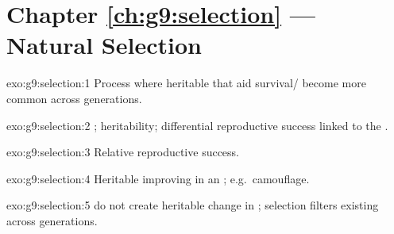 \section*{Chapter \ref{ch:g9:selection} --- Natural Selection}

\begin{solution}{exo:g9:selection:1}
Process where heritable  that aid survival/ become more
common across generations.
\end{solution}

\begin{solution}{exo:g9:selection:2}
; heritability; differential reproductive success linked to the
.
\end{solution}

\begin{solution}{exo:g9:selection:3}
Relative reproductive success.
\end{solution}

\begin{solution}{exo:g9:selection:4}
Heritable  improving  in an ; e.g.\ camouflage.
\end{solution}

\begin{solution}{exo:g9:selection:5}
 do not create heritable change in ; selection filters
existing  across generations.
\end{solution}

